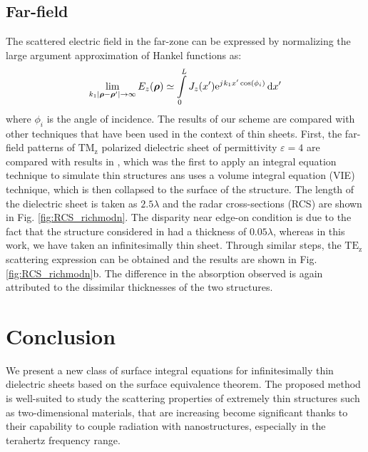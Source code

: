 \documentclass{ieeeaccess}
\newcommand{\E}{\varepsilon}  %
\newcommand{\p}{\rho}  %
\newcommand{\vp}{\boldsymbol \p}  %
\renewcommand{\inf}{\infty}  %
\renewcommand{\^}{\hat}  %
\newcommand*\diff{\mathop{}\!\mathrm{d}} %
\newcommand{\e}{\mathrm{e}} %
\renewcommand{\j}{{j}\mkern1mu} %
\begin{document}
\subsection{Far-field}
%
The scattered electric field in the far-zone can be expressed by normalizing the large argument approximation of Hankel functions as:
%
\begin{equation}
  \lim_{k_1|\vp - \vp'|\to\inf} E_z(\vp) \simeq \int \limits_{0}^{L} J_z(x') \e^{\j k_1 x' \cos(\phi_i)} \diff{x'}
  \label{eq:far-field}
\end{equation}
%
where $\phi_i$ is the angle of incidence. The results of our scheme are compared with other techniques that have been used in the context of thin sheets. First, the far-field patterns of $\mathrm{TM_z}$ polarized dielectric sheet of permittivity $\E = 4$ are compared with results in \cite{Richmond1965}, which was the first to apply an integral equation technique to simulate thin structures ans uses a volume integral equation (VIE) technique, which is then collapsed to the surface of the structure. The length of the dielectric sheet is taken as $2.5 \lambda$ and the radar cross-sections (RCS) are shown in Fig. \ref{fig:RCS_richmodn}. The disparity near edge-on condition is due to the fact that the structure considered in \cite{Richmond1965} had a thickness of $0.05 \lambda$, whereas in this work, we have taken an infinitesimally thin sheet. Through  similar steps, the $\mathrm{TE_z}$ scattering expression can be obtained and the results are shown in Fig. \ref{fig:RCS_richmodn}b. The difference in the absorption observed is again attributed to the dissimilar thicknesses of the two structures.
% 

%
%
%
%
\section{Conclusion}
We present a new class of surface integral equations for infinitesimally thin dielectric sheets based on the surface equivalence theorem. The proposed method is well-suited to study the scattering properties of extremely thin structures such as two-dimensional materials, that are increasing become significant thanks to their capability to couple radiation with nanostructures, especially in the terahertz frequency range.

\end{document}
